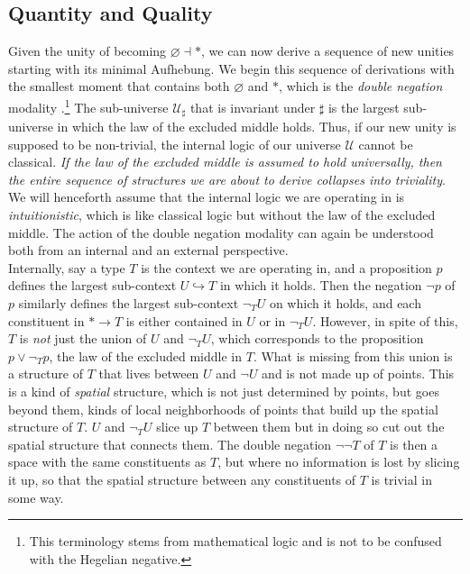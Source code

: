 \documentclass{article}
\begin{document}
\subsection{Quantity and Quality}
Given the unity of becoming $\varnothing\dashv *$, we can now derive a sequence of new unities starting with 
its minimal Aufhebung. We begin this sequence of derivations with the smallest moment that contains both 
$\varnothing$ and $*$, which is the \emph{double negation} modality \cite{Sketches}.\footnote{This terminology
stems from mathematical logic and is not to be confused with the Hegelian negative.} The sub-universe 
$\mathcal{U}_\sharp$ that is invariant under $\sharp$ is the largest sub-universe in which the law of the 
excluded middle holds. Thus, if our new unity is supposed to be non-trivial, the internal logic of our 
universe $\mathcal{U}$ cannot be classical. \emph{If the law of the excluded middle is assumed to hold 
universally, then the entire sequence of structures we are about to derive collapses into triviality}. We 
will henceforth assume that the internal logic we are operating in is \emph{intuitionistic}, which is like 
classical logic but without the law of the excluded middle. The action of the double negation modality can 
again be understood both from an internal and an external perspective. \\

Internally, say a type $T$ is the context we are operating in, and a proposition $p$ defines the largest 
sub-context $U\hookrightarrow T$ in which it holds. Then the negation $\neg p$ of $p$ similarly defines the 
largest sub-context $\neg_T U$ on which it holds, and each constituent in $*\rightarrow T$ is either 
contained in $U$ or in $\neg_T U$. However, in spite of this, $T$ is \emph{not} just the union of $U$ and 
$\neg_T U$, which corresponds to the proposition $p\vee \neg_T p$, the law of the excluded middle in $T$. 
What is missing from this union is a structure of $T$ that lives between $U$ and $\neg U$ and is not made up 
of points. This is a kind of \emph{spatial} structure, which is not just determined by points, but goes 
beyond them, kinds of local neighborhoods of points that build up the spatial structure of $T$. $U$ and 
$\neg_T U$ slice up $T$ between them but in doing so cut out the spatial structure that connects them. The 
double negation $\neg\neg T$ of $T$ is then a space with the same constituents as $T$, but where no 
information is lost by slicing it up, so that the spatial structure between any constituents of $T$ is 
trivial in some way. \\
\end{document}
